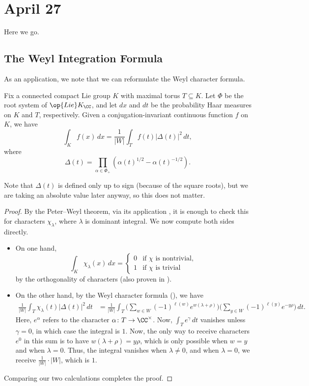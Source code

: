 \documentclass[../notes.tex]{subfiles}
\begin{document}
\section{April 27}
Here we go.

\subsection{The Weyl Integration Formula}
As an application, we note that we can reformulate the Weyl character formula.
\begin{theorem} \label{thm:weyl-integration}
	Fix a connected compact Lie group $K$ with maximal torus $T\subseteq K$. Let $\Phi$ be the root system of $\op{Lie}K_\CC$, and let $dx$ and $dt$ be the probability Haar measures on $K$ and $T$, respectively. Given a conjugation-invariant continuous function $f$ on $K$, we have
	\[\int_Kf(x)\,dx=\frac1{\left|W\right|}\int_Tf(t)\left|\Delta(t)\right|^2\,dt,\]
	where
	\[\Delta(t)=\prod_{\alpha\in\Phi_+}\left(\alpha(t)^{1/2}-\alpha(t)^{-1/2}\right).\]
\end{theorem}
\begin{remark}
	Note that $\Delta(t)$ is defined only up to sign (because of the square roots), but we are taking an absolute value later anyway, so this does not matter.
\end{remark}
\begin{proof}
	By the Peter--Weyl theorem, via its application , it is enough to check this for characters $\chi_\lambda$, where $\lambda$ is dominant integral. We now compute both sides directly.
	\begin{itemize}
		\item On one hand,
		\[\int_K\chi_\lambda(x)\,dx=\begin{cases}
			0 & \text{if }\chi\text{ is nontrivial}, \\
			1 & \text{if }\chi\text{ is trivial}
		\end{cases}\]
		by the orthogonality of characters (also proven in ).
		\item On the other hand, by the Weyl character formula (), we have
		\begin{align*}
			\frac1{\left|W\right|}\int_T\chi_\lambda(t)\left|\Delta(t)\right|^2\,dt &= \frac1{\left|W\right|}\int_T\Bigg(\sum_{w\in W}(-1)^{\ell(w)}e^{w(\lambda+\rho)}\Bigg)\Bigg(\sum_{y\in W}(-1)^{\ell(y)}e^{-y\rho}\Bigg)\,dt.
		\end{align*}
		Here, $e^\alpha$ refers to the character $\alpha\colon T\to\CC^\times$. Now, $\int_Te^\gamma\,dt$ vanishes unless $\gamma=0$, in which case the integral is $1$. Now, the only way to receive characters $e^0$ in this sum is to have $w(\lambda+\rho)=y\rho$, which is only possible when $w=y$ and when $\lambda=0$. Thus, the integral vanishes when $\lambda\ne0$, and when $\lambda=0$, we receive $\frac1{\left|W\right|}\cdot\left|W\right|$, which is $1$.
	\end{itemize}
	Comparing our two calculations completes the proof.
\end{proof}
\end{document}
